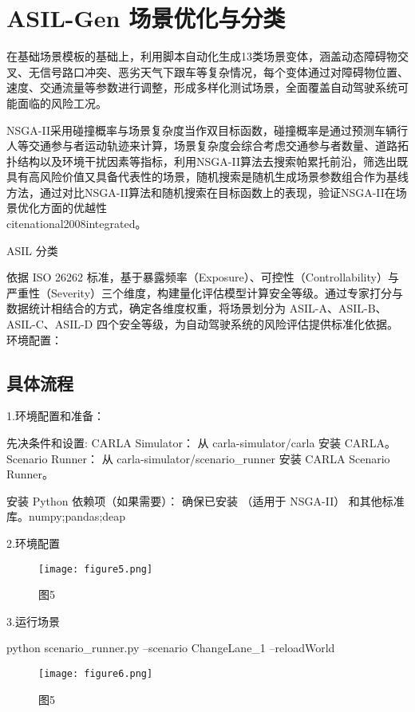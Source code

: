 \section{ASIL-Gen 场景优化与分类}


在基础场景模板的基础上，利用脚本自动化生成13类场景变体，涵盖动态障碍物交叉、无信号路口冲突、恶劣天气下跟车等复杂情况，每个变体通过对障碍物位置、速度、交通流量等参数进行调整，形成多样化测试场景，全面覆盖自动驾驶系统可能面临的风险工况。


NSGA-II采用碰撞概率与场景复杂度当作双目标函数，碰撞概率是通过预测车辆行人等交通参与者运动轨迹来计算，场景复杂度会综合考虑交通参与者数量、道路拓扑结构以及环境干扰因素等指标，利用NSGA-II算法去搜索帕累托前沿，筛选出既具有高风险价值又具备代表性的场景，随机搜索是随机生成场景参数组合作为基线方法，通过对比NSGA-II算法和随机搜索在目标函数上的表现，验证NSGA-II在场景优化方面的优越性\\cite{national2008integrated}。

ASIL 分类

依据 ISO 26262 标准，基于暴露频率（Exposure）、可控性（Controllability）与严重性（Severity）三个维度，构建量化评估模型计算安全等级。通过专家打分与数据统计相结合的方式，确定各维度权重，将场景划分为 ASIL-A、ASIL-B、ASIL-C、ASIL-D 四个安全等级，为自动驾驶系统的风险评估提供标准化依据。
环境配置：



\subsection{具体流程}

1.环境配置和准备：

先决条件和设置:
CARLA Simulator：
从 carla-simulator/carla 安装 CARLA。
Scenario Runner：
从 carla-simulator/scenario\_runner 安装 CARLA Scenario Runner。

安装 Python 依赖项（如果需要）：
确保已安装 （适用于 NSGA-II） 和其他标准库。numpy;pandas;deap

2.环境配置


\begin{figure}[htbp]
	\centering
	\texttt{[image: figure5.png]} %
	\caption{图5} %
	\label{fig:example} %
\end{figure}

3.运行场景

python scenario\_runner.py --scenario ChangeLane\_1 --reloadWorld


\begin{figure}[htbp]
	\centering
	\texttt{[image: figure6.png]} %
	\caption{图5} %
	\label{fig:example} %
\end{figure}

